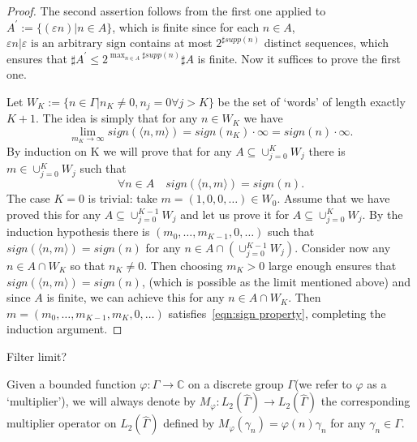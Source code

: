 \begin{proof}
    The second assertion follows from the first one applied to $A^{\prime}:=\{(\varepsilon n)| n\in A\}$, which is finite since for each $n\in A$, ${\varepsilon n| \varepsilon\text{ is an arbitrary sign}}$ contains 
    at most $2^{\sharp supp(n)}$ distinct sequences, which ensures that $\sharp A^{\prime}\leq 2^{\max_{n\in A}\sharp supp(n)}\sharp A$ is finite. Now it suffices to prove the first one.
    \par Let $W_K:=\{n\in\Gamma|n_K\ne0,n_j=0\forall j>K\}$ be the set of ‘words’ of length exactly $K + 1$. The idea is simply that for any $n \in W_K$ we have
        \[  \lim_{m_K\to\infty} sign(\langle n,m\rangle)=sign(n_K)\cdot\infty=sign(n)\cdot\infty.\]
    By induction on K we will prove that for any $A\subseteq \cup_{j=0}^{K}W_j$ there is $m\in \cup_{j=0}^{K}W_j$ such that
    \begin{equation}\label{eqn:sign property}
        \forall n\in A\quad sign(\langle n,m\rangle)=sign(n).
    \end{equation}
    The case $K = 0$ is trivial: take $m=(1,0,0,\ldots)\in W_0$. Assume that we have proved this for any $A\subseteq \cup_{j=0}^{K-1}W_j$ and let 
    us prove it for $A\subseteq \cup_{j=0}^{K}W_j$. By the induction hypothesis there is $(m_0,\ldots,m_{K-1},0,\ldots)$ such that $sign(\langle n,m\rangle)=sign(n)$ 
    for any $n\in A\cap( \cup_{j=0}^{K-1}W_j )$. Consider now any $n \in A \cap W_K$ so that $n_K\ne0$. Then choosing $m_K>0$ large enough ensures that $sign(\langle n,m\rangle)=sign(n)$, 
    (which is possible as the limit mentioned above) and since $A$ is finite, we can achieve this for any $n\in A\cap W_K$. Then $m=(m_0,\ldots,m_{K-1},m_{K},0,\ldots)$ satisfies~\eqref{eqn:sign property}, completing the induction argument.
\end{proof}

\begin{remark}
    Filter limit?
\end{remark}

\begin{definition}[Multiplier]
    Given a bounded function $\varphi\colon \Gamma\to\mathbb{C}$ on a discrete group $\Gamma$(we refer to $\varphi$ as
    a ‘multiplier’), we will always denote by $M_\varphi\colon L_2(\widehat{\Gamma})\to L_2(\widehat{\Gamma})$ the corresponding 
    multiplier operator on $L_2(\widehat{\Gamma})$ defined by $M_\varphi(\gamma_n)=\varphi(n)\gamma_n$ for any $\gamma_n\in\Gamma$. 
\end{definition}

